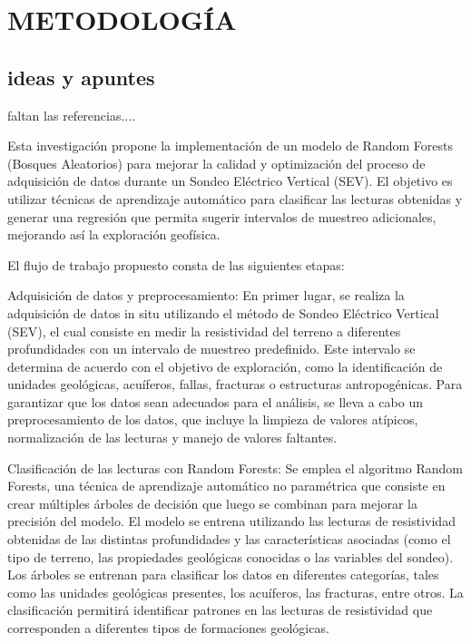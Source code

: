 \chapter{METODOLOGÍA}

\section{ideas y apuntes}

faltan las referencias....

Esta investigación propone la implementación de un modelo de Random Forests (Bosques Aleatorios) para mejorar la calidad y optimización del proceso de adquisición de datos durante un Sondeo Eléctrico Vertical (SEV). El objetivo es utilizar técnicas de aprendizaje automático para clasificar las lecturas obtenidas y generar una regresión que permita sugerir intervalos de muestreo adicionales, mejorando así la exploración geofísica.

El flujo de trabajo propuesto consta de las siguientes etapas:

Adquisición de datos y preprocesamiento: En primer lugar, se realiza la adquisición de datos in situ utilizando el método de Sondeo Eléctrico Vertical (SEV), el cual consiste en medir la resistividad del terreno a diferentes profundidades con un intervalo de muestreo predefinido. Este intervalo se determina de acuerdo con el objetivo de exploración, como la identificación de unidades geológicas, acuíferos, fallas, fracturas o estructuras antropogénicas. Para garantizar que los datos sean adecuados para el análisis, se lleva a cabo un preprocesamiento de los datos, que incluye la limpieza de valores atípicos, normalización de las lecturas y manejo de valores faltantes.

Clasificación de las lecturas con Random Forests: Se emplea el algoritmo Random Forests, una técnica de aprendizaje automático no paramétrica que consiste en crear múltiples árboles de decisión que luego se combinan para mejorar la precisión del modelo. El modelo se entrena utilizando las lecturas de resistividad obtenidas de las distintas profundidades y las características asociadas (como el tipo de terreno, las propiedades geológicas conocidas o las variables del sondeo). Los árboles se entrenan para clasificar los datos en diferentes categorías, tales como las unidades geológicas presentes, los acuíferos, las fracturas, entre otros. La clasificación permitirá identificar patrones en las lecturas de resistividad que corresponden a diferentes tipos de formaciones geológicas.

